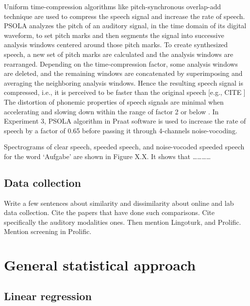 \documentclass[a4paper, nobind]{templates/ociamthesis}
\begin{document}
Uniform time-compression algorithms like pitch-synchronous overlap-add technique \autocites[PSOLA,][]{Charpentier1986,Moulines1990} are used to compress the speech signal and increase the rate of speech.
PSOLA analyzes the pitch of an auditory signal, in the time domain of its digital waveform, to set pitch marks and then segments the signal into successive analysis windows centered around those pitch marks.
To create synthesized speech, a new set of pitch marks are calculated and the analysis windows are rearranged.
Depending on the time-compression factor, some analysis windows are deleted, and the remaining windows are concatenated by superimposing and averaging the neighboring analysis windows.
Hence the resulting speech signal is compressed, i.e., it is perceived to be faster than the original speech {[}e.g., CITE {]}
The distortion of phonemic properties of speech signals are minimal when accelerating and slowing down within the range of factor 2 or below \autocite{Moulines1990}.
In Experiment 3, PSOLA algorithm in Praat software is used to increase the rate of speech by a factor of 0.65 before passing it through 4-channels noise-vocoding.

Spectrograms of clear speech, speeded speech, and noise-vocoded speeded speech for the word `Aufgabe' are shown in Figure X.X. It shows that \ldots\ldots\ldots\ldots{}

\hypertarget{data-collection}{%
\section{Data collection}\label{data-collection}}

Write a few sentences about similarity and dissimilarity about online and lab data collection.
Cite the papers that have done such comparisons.
Cite specifically the auditory modalities ones.
Then mention Lingoturk, and Prolific.
Mention screening in Prolific.

\minitoc 

\hypertarget{general-statistical-approach}{%
\chapter{General statistical approach}\label{general-statistical-approach}}

\hypertarget{linear-regression}{%
\section{Linear regression}\label{linear-regression}}
\end{document}
